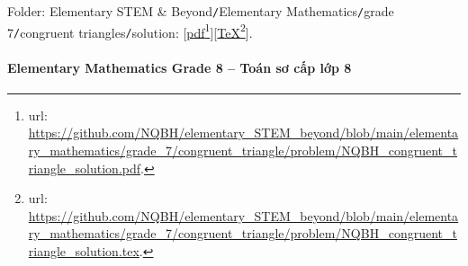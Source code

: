 \documentclass[12pt]{article}
\begin{document}
\begin{itemize}
	Folder: {\sf Elementary STEM \& Beyond{\tt/}Elementary Mathematics{\tt/}grade 7{\tt/}congruent triangles{\tt/}solution}: [\href{https://github.com/NQBH/elementary_STEM_beyond/blob/main/elementary_mathematics/grade_7/congruent_triangle/problem/NQBH_congruent_triangle_solution.pdf}{pdf}\footnote{{\sc url}: \url{https://github.com/NQBH/elementary_STEM_beyond/blob/main/elementary_mathematics/grade_7/congruent_triangle/problem/NQBH_congruent_triangle_solution.pdf}.}][\href{https://github.com/NQBH/elementary_STEM_beyond/blob/main/elementary_mathematics/grade_7/congruent_triangle/problem/NQBH_congruent_triangle_solution.tex}{\TeX}\footnote{{\sc url}: \url{https://github.com/NQBH/elementary_STEM_beyond/blob/main/elementary_mathematics/grade_7/congruent_triangle/problem/NQBH_congruent_triangle_solution.tex}.}].
\end{itemize}

\paragraph{Elementary Mathematics Grade 8 -- Toán sơ cấp lớp 8}
\end{document}
